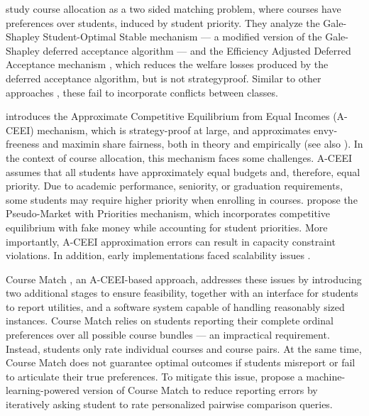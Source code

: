 \citet{diebold2014course} study course allocation as a two sided matching problem, where courses have preferences over students, induced by student priority. 
They analyze the Gale-Shapley Student-Optimal Stable mechanism --- a modified version of the Gale-Shapley deferred acceptance algorithm \cite{galeshapley} --- and the Efficiency Adjusted Deferred Acceptance mechanism \cite{kesten2010schoolchoice}, which reduces the welfare losses produced by the deferred acceptance algorithm, but is not strategyproof. 
Similar to other approaches \cite{nogareda2017optimizing, romero2024strategic}, these fail to incorporate conflicts between classes. %

\citet{budish2011ef1} introduces the Approximate Competitive Equilibrium from Equal Incomes (A-CEEI) mechanism, which is strategy-proof at large, and approximates envy-freeness and maximin share fairness, both in theory and empirically (see also \cite{othman2010courseallocation}). 
In the context of course allocation, this mechanism faces some challenges. 
A-CEEI assumes that all students have approximately equal budgets and, therefore, equal priority. Due to academic performance, seniority, or graduation requirements, some students may require higher priority when enrolling in courses. \citet{kornbluth2021undergraduate} propose the Pseudo-Market with Priorities mechanism, which incorporates competitive equilibrium with fake money while accounting for student priorities. 
More importantly, A-CEEI approximation errors can result in capacity constraint violations. In addition, early implementations faced scalability issues \cite{budish2017coursematch, atef2020optimization}.

Course Match \cite{budish2017coursematch}, an A-CEEI-based approach, addresses these issues by introducing two additional stages to ensure feasibility, together with an interface for students to report utilities, and a software system capable of handling reasonably sized instances. 
Course Match relies on students reporting their complete ordinal preferences over all possible course bundles --- an impractical requirement. Instead, students only rate individual courses and course pairs. 
At the same time, Course Match does not guarantee optimal outcomes if students misreport or fail to articulate their true preferences. To mitigate this issue, \citet{soumalias2024courseallocation} propose a machine-learning-powered version of Course Match to reduce reporting errors by iteratively asking student to rate personalized pairwise comparison queries. 

